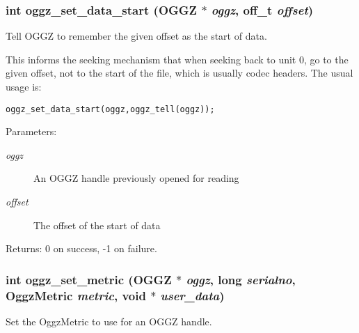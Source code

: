 \subsubsection{\setlength{\rightskip}{0pt plus 5cm}int oggz\_\-set\_\-data\_\-start ({\bf OGGZ} $\ast$ {\em oggz}, off\_\-t {\em offset})}\label{group__seek__api_a4}


Tell OGGZ to remember the given offset as the start of data. 

This informs the seeking mechanism that when seeking back to unit 0, go to the given offset, not to the start of the file, which is usually codec headers. The usual usage is: \small\begin{alltt}
    oggz\_set\_data\_start (oggz, oggz\_tell (oggz));
\end{alltt}\normalsize 
 \begin{Desc}
\item[Parameters:]
\begin{description}
\item[{\em oggz}]An OGGZ handle previously opened for reading \item[{\em offset}]The offset of the start of data \end{description}
\end{Desc}
\begin{Desc}
\item[Returns:]0 on success, -1 on failure. \end{Desc}
\subsubsection{\setlength{\rightskip}{0pt plus 5cm}int oggz\_\-set\_\-metric ({\bf OGGZ} $\ast$ {\em oggz}, long {\em serialno}, {\bf Oggz\-Metric} {\em metric}, void $\ast$ {\em user\_\-data})}\label{group__seek__api_a2}


Set the Oggz\-Metric to use for an OGGZ handle. 

